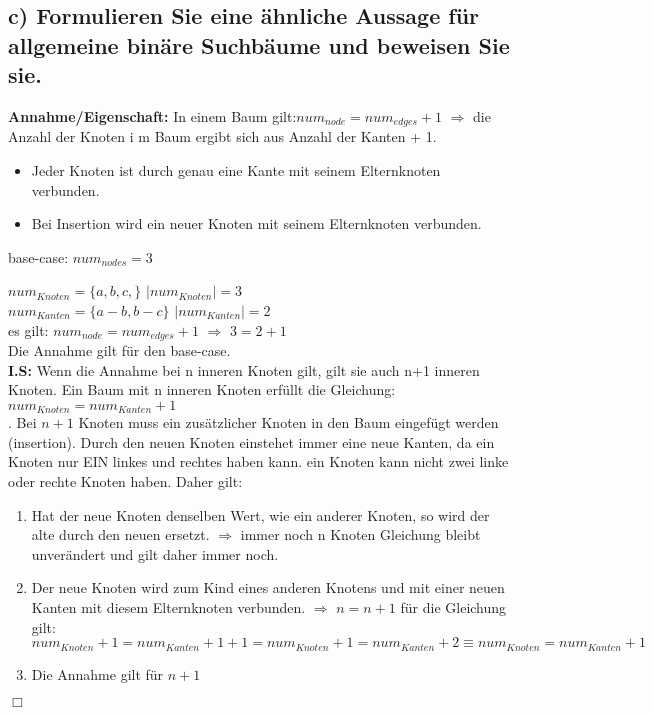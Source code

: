 \small
\subsection*{c) Formulieren Sie eine ähnliche Aussage für allgemeine binäre Suchbäume und beweisen Sie sie.} 

\textbf{Annahme/Eigenschaft:} In einem Baum gilt:$num_{node} = num_{edges} + 1$ $\Rightarrow$ die Anzahl der Knoten i m Baum ergibt sich aus Anzahl der Kanten + 1.
\begin{itemize}
	\item Jeder Knoten ist durch genau eine Kante mit seinem Elternknoten verbunden.
	\item Bei Insertion wird ein neuer Knoten mit seinem Elternknoten verbunden.
\end{itemize}

base-case: $num_{nodes} = 3$


$num_{Knoten} = \{a,b,c,\}$ $|num_{Knoten}| = 3$ \\
$num_{Kanten} = \{a-b,b-c\}$ $|num_{Kanten}| = 2$ \\
es gilt: $num_{node} = num_{edges} + 1$ $\Rightarrow$ $3 = 2 + 1$ \\
Die Annahme gilt für den base-case. \\

\textbf{I.S:} Wenn die Annahme bei n inneren Knoten gilt, gilt sie auch n+1 inneren Knoten. 
Ein Baum mit n inneren Knoten erfüllt die Gleichung: $num_{Knoten} = num_{Kanten} + 1$ \\ . Bei $n+1$ Knoten muss ein zusätzlicher Knoten in den Baum eingefügt werden (insertion). Durch den neuen Knoten einstehet immer eine neue Kanten, da ein Knoten nur EIN linkes und rechtes haben kann. ein Knoten kann nicht zwei linke oder rechte Knoten haben. Daher gilt: \\
\begin{enumerate}
	\item Hat der neue Knoten denselben Wert, wie ein anderer Knoten, so wird der alte durch den neuen ersetzt. $\Rightarrow$ immer noch n Knoten Gleichung bleibt unverändert und gilt daher immer noch.
	\item Der neue Knoten wird zum Kind eines anderen Knotens und mit einer neuen Kanten mit diesem Elternknoten verbunden. $\Rightarrow$ $n = n+1$  für die Gleichung gilt: $num_{Knoten} + 1 = num_{Kanten} + 1 + 1 = num_{Knoten} + 1 = num_{Kanten} + 2 \equiv num_{Knoten} = num_{Kanten} + 1$
	\item Die Annahme gilt für $n+1$
\end{enumerate}
\begin{flushright}
$\Box$
\end{flushright}


